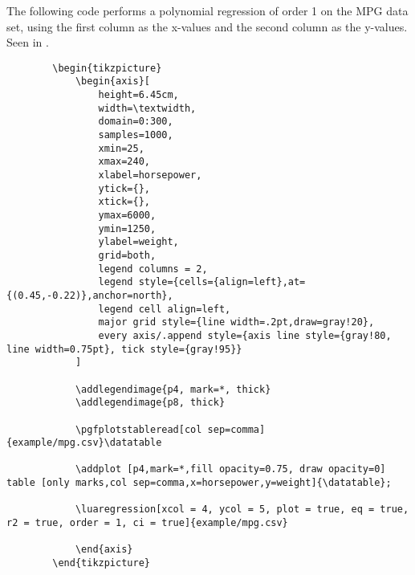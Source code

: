 \documentclass[11pt]{article}
\begin{document}
    The following code performs a polynomial regression of order 1 on the MPG data set, using the first column as the x-values and the second column as the y-values.
    Seen in .

    \begin{verbatim}
        \begin{tikzpicture}
            \begin{axis}[
                height=6.45cm,
                width=\textwidth,
                domain=0:300,
                samples=1000,
                xmin=25,
                xmax=240,
                xlabel=horsepower,
                ytick={},
                xtick={},
                ymax=6000,
                ymin=1250,
                ylabel=weight,
                grid=both,
                legend columns = 2,
                legend style={cells={align=left},at={(0.45,-0.22)},anchor=north},
                legend cell align=left,
                major grid style={line width=.2pt,draw=gray!20},
                every axis/.append style={axis line style={gray!80, line width=0.75pt}, tick style={gray!95}}
            ]

            \addlegendimage{p4, mark=*, thick}
            \addlegendimage{p8, thick}

            \pgfplotstableread[col sep=comma]{example/mpg.csv}\datatable

            \addplot [p4,mark=*,fill opacity=0.75, draw opacity=0] table [only marks,col sep=comma,x=horsepower,y=weight]{\datatable};

            \luaregression[xcol = 4, ycol = 5, plot = true, eq = true, r2 = true, order = 1, ci = true]{example/mpg.csv}

            \end{axis}
        \end{tikzpicture}
    \end{verbatim}

    \pagebreak
\end{document}
